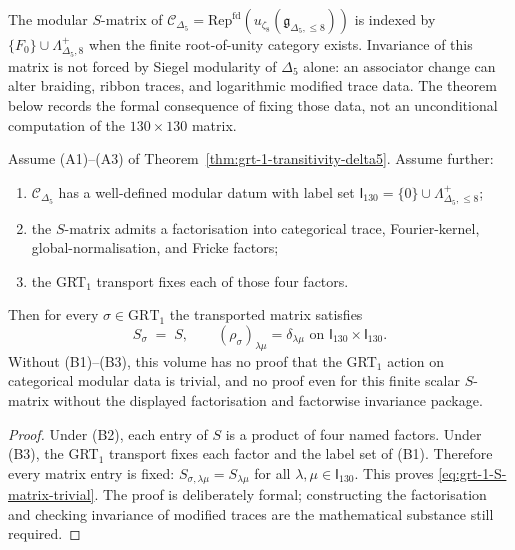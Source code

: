 \begin{remark}
\label{rem:as-grt-1-S-matrix}
%
The modular $S$-matrix of $\mathcal C_{\Delta_5} =
\mathrm{Rep}^{\mathrm{fd}}(u_{\zeta_8}(\mathfrak g_{\Delta_5, \le 8}))$
is indexed by
$\{F_0\} \cup \Lambda^+_{\Delta_5, 8}$ when the finite
root-of-unity category exists. Invariance of this matrix is not
forced by Siegel modularity of $\Delta_5$ alone: an associator
change can alter braiding, ribbon traces, and logarithmic modified
trace data. The theorem below records the formal consequence of
fixing those data, not an unconditional computation of the
$130\times130$ matrix.
\end{remark}

\begin{theorem}
\label{thm:grt-1-S-matrix-trivial}
%
%
Assume \textup{(A1)}--\textup{(A3)} of
Theorem~\ref{thm:grt-1-transitivity-delta5}. Assume further:
\begin{enumerate}[label=\textup{(B\arabic*)}]
\item $\mathcal C_{\Delta_5}$ has a well-defined modular datum with
label set
$\mathsf I_{130}=\{0\}\cup\Lambda^+_{\Delta_5,\le8}$;
\item the $S$-matrix admits a factorisation into categorical trace,
Fourier-kernel, global-normalisation, and Fricke factors;
\item the GRT$_1$ transport fixes each of those four factors.
\end{enumerate}
Then for every $\sigma\in\mathrm{GRT}_1$ the transported matrix
satisfies
\begin{equation}\label{eq:grt-1-S-matrix-trivial}
 S_\sigma \;=\; S,
 \qquad
 (\rho_\sigma)_{\lambda\mu} = \delta_{\lambda\mu}
 \text{ on }
 \mathsf I_{130}\times\mathsf I_{130}.
\end{equation}
Without \textup{(B1)}--\textup{(B3)}, this volume has no proof that
the GRT$_1$ action on categorical modular data is trivial, and no
proof even for this finite scalar $S$-matrix without the displayed
factorisation and factorwise invariance package.
\end{theorem}

\begin{proof}
Under \textup{(B2)}, each entry of $S$ is a product of four named
factors. Under \textup{(B3)}, the GRT$_1$ transport fixes each
factor and the label set of \textup{(B1)}. Therefore every matrix
entry is fixed:
$S_{\sigma,\lambda\mu}=S_{\lambda\mu}$ for all
$\lambda,\mu\in\mathsf I_{130}$. This proves
\eqref{eq:grt-1-S-matrix-trivial}. The proof is deliberately
formal; constructing the factorisation and checking invariance of
modified traces are the mathematical substance still required.
\end{proof}

